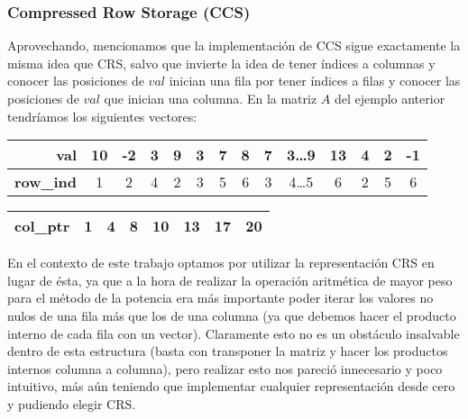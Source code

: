 \subsubsection*{Compressed Row Storage (CCS)}
\par Aprovechando, mencionamos que la implementaci\'on de CCS sigue exactamente
la misma idea que CRS, salvo que invierte la idea de tener \'indices a columnas
y conocer las posiciones de $val$ inician una fila por tener \'indices a filas y
conocer las posiciones de $val$ que inician una columna. En la matriz $A$ del
ejemplo anterior tendr\'iamos los siguientes vectores\cite{netlib_ccs}:

\begin{table}[!h]
    \begin{tabular}{|r|c|c|c|c|c|c|c|c|c|c|c|c|c|}
        \hline
        \textbf{val}&10&-2&3&9&3&7&8&7&3\dots 9&13&4&2&-1\\
        \hline
        \textbf{row\_ind}&1&2&4&2&3&5&6&3&4\dots 5&6&2&5&6\\
        \hline
    \end{tabular}
    \begin{tabular}{|r|c|c|c|c|c|c|c|}
        \hline
        \textbf{col\_ptr}&1&4&8&10&13&17&20\\
        \hline
    \end{tabular}
\end{table}

\par En el contexto de este trabajo optamos por utilizar la representaci\'on CRS
en lugar de \'esta, ya que a la hora de realizar la operaci\'on aritm\'etica de
mayor peso para el m\'etodo de la potencia era m\'as importante poder iterar los
valores no nulos de una fila m\'as que los de una columna (ya que debemos hacer
el producto interno de cada fila con un vector). Claramente esto no es un
obst\'aculo insalvable dentro de esta estructura (basta con transponer la
matriz y hacer los productos internos columna a columna), pero realizar esto nos
pareci\'o innecesario y poco intuitivo, m\'as a\'un teniendo que implementar
cualquier representaci\'on desde cero y pudiendo elegir CRS.

